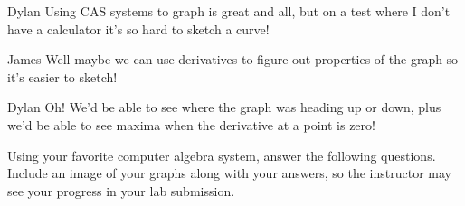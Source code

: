 \documentclass{ximera}
\begin{document}
\begin{dialogue}
\item[Dylan] Using CAS systems to graph is great and all, but on a test where I don't have a calculator it's so hard to sketch a curve!
\item[James] Well maybe we can use derivatives to figure out properties of the graph so it's easier to sketch!
\item[Dylan] Oh! We'd be able to see where the graph was heading up or down, plus we'd be able to see maxima when the derivative at a point is zero!
\end{dialogue}

Using your favorite computer algebra system, answer the following questions. Include an image of your graphs along with your answers, so the instructor may see your progress in your lab submission. 
\end{document}
